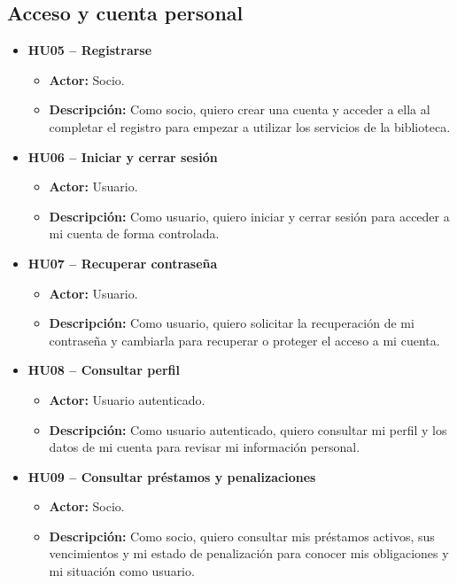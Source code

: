 \subsection{Acceso y cuenta personal}
\begin{itemize}
	\item \textbf{HU05 -- Registrarse}
	\begin{itemize}
		\item \textbf{Actor:} Socio.
		\item \textbf{Descripción:} Como socio, quiero crear una cuenta y acceder a ella al completar el registro para empezar a utilizar los servicios de la biblioteca.
	\end{itemize}
	
	\item \textbf{HU06 -- Iniciar y cerrar sesión}
	\begin{itemize}
		\item \textbf{Actor:} Usuario.
		\item \textbf{Descripción:} Como usuario, quiero iniciar y cerrar sesión para acceder a mi cuenta de forma controlada.
	\end{itemize}
	
	\item \textbf{HU07 -- Recuperar contraseña}
	\begin{itemize}
		\item \textbf{Actor:} Usuario.
		\item \textbf{Descripción:} Como usuario, quiero solicitar la recuperación de mi contraseña y cambiarla para recuperar o proteger el acceso a mi cuenta.
	\end{itemize}
	
	\item \textbf{HU08 -- Consultar perfil}
	\begin{itemize}
		\item \textbf{Actor:} Usuario autenticado.
		\item \textbf{Descripción:} Como usuario autenticado, quiero consultar mi perfil y los datos de mi cuenta para revisar mi información personal.
	\end{itemize}
	
	\item \textbf{HU09 -- Consultar préstamos y penalizaciones}
	\begin{itemize}
		\item \textbf{Actor:} Socio.
		\item \textbf{Descripción:} Como socio, quiero consultar mis préstamos activos, sus vencimientos y mi estado de penalización para conocer mis obligaciones y mi situación como usuario.
	\end{itemize}
	

\end{itemize}
